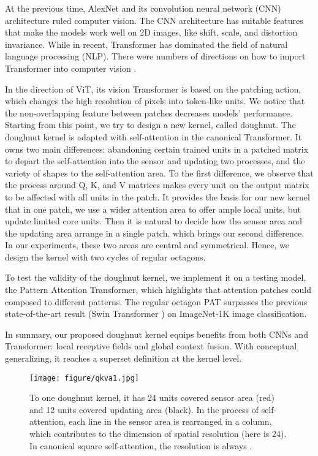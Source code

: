 \documentclass{article}
\theoremstyle{plain}
\theoremstyle{definition}
\theoremstyle{remark}
\begin{document}
At the previous time, AlexNet \cite{krizhevsky2012imagenet} and its convolution neural network (CNN) architecture ruled computer vision. The CNN architecture has suitable features that make the models work well on 2D images, like shift, scale, and distortion invariance. While in recent, Transformer \cite{vaswani2017attention} has dominated the field of natural language processing (NLP). There were numbers of directions on how to import Transformer into computer vision \cite{carion2020end,wu2021cvt}.

In the direction of ViT, its vision Transformer is based on the patching action, which changes the high resolution of pixels into token-like units. We notice that the non-overlapping feature between patches decreases models' performance. Starting from this point, we try to design a new kernel, called doughnut. The doughnut kernel is adapted with self-attention in the canonical Transformer. It owns two main differences: abandoning certain trained units in a patched matrix to depart the self-attention into the sensor and updating two processes, and the variety of shapes to the self-attention area. To the first difference, we observe that the process around Q, K, and V matrices makes every unit on the output matrix to be affected with all units in the patch. It provides the basis for our new kernel that in one patch, we use a wider attention area to offer ample local units, but update limited core units. Then it is natural to decide how the sensor area and the updating area arrange in a single patch, which brings our second difference. In our experiments, these two areas are central and symmetrical. Hence, we design the kernel with two cycles of regular octagons. 

To test the validity of the doughnut kernel, we implement it on a testing model, the Pattern Attention Transformer, which highlights that attention patches could composed to different patterns. The regular octagon PAT surpasses the previous state-of-the-art result (Swin Transformer \cite{liu2021swin}) on ImageNet-1K image classification. 

In summary, our proposed doughnut kernel equips benefits from both CNNs and Transformer: local receptive fields and global context fusion. With conceptual generalizing, it reaches a superset definition at the kernel level.


\begin{figure*}[ht]
\vskip 0.15in
\centering
    \texttt{[image: figure/qkva1.jpg]}
\caption{To one doughnut kernel, it has 24 units covered sensor area (red) and 12 units covered updating area (black). In the process of self-attention, each line in the sensor area is rearranged in a column, which contributes to the dimension of spatial resolution (here is 24). In canonical square self-attention, the resolution is always .}
\label{fig:qkva}
\vskip 0.1in
\end{figure*}
\end{document}
